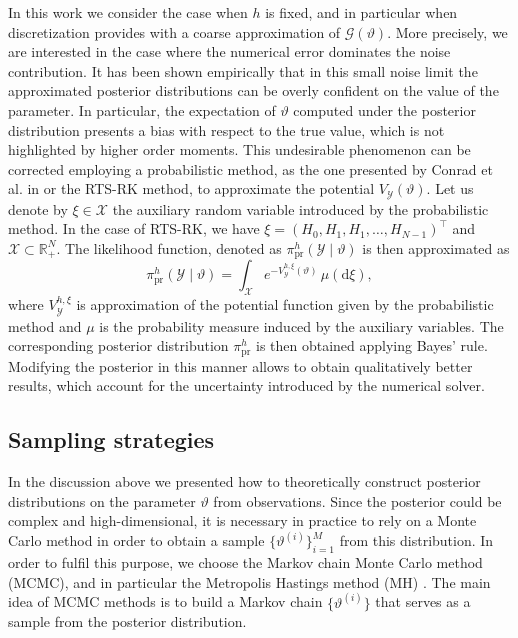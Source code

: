\documentclass{siamart1116}
\numberwithin{theorem}{section}
\renewcommand{\theta}{\vartheta}
\newcommand{\R}{\mathbb{R}}
\newcommand{\dd}{\mathrm{d}}
\begin{document}
In this work we consider the case when $h$ is fixed, and in particular when discretization provides with a coarse approximation of $\mathcal{G}(\theta)$. More precisely, we are interested in the case where the numerical error dominates the noise contribution. It has been shown empirically \cite{CGS16, COS17} that in this small noise limit the approximated posterior distributions can be overly confident on the value of the parameter. In particular, the expectation of $\theta$ computed under the posterior distribution presents a bias with respect to the true value, which is not highlighted by higher order moments. This undesirable phenomenon can be corrected employing a probabilistic method, as the one presented by Conrad et al. in \cite{CGS16} or the RTS-RK method, to approximate the potential $V_\mathcal{Y}(\theta)$. Let us denote by $\xi \in \mathcal{X}$ the auxiliary random variable introduced by the probabilistic method. In the case of RTS-RK, we have $\xi = (H_0, H_1, H_1, \ldots, H_{N-1})^\top$ and $\mathcal{X} \subset \R_+^N$. The likelihood function, denoted as  $\pi^h_{\mathrm{pr}}(\mathcal{Y}\mid\theta)$ is then approximated as 
\begin{equation}\label{eq:LikelihoodProb}
	\pi^h_{\mathrm{pr}}(\mathcal{Y}\mid \theta) = \int_{\mathcal{X}} e^{-V^{h,\xi}_{\mathcal{Y}}(\theta)} \, \mu(\dd \xi),
\end{equation}
where $V^{h, \xi}_{\mathcal{Y}}$ is approximation of the potential function given by the probabilistic method and $\mu$ is the probability measure induced by the auxiliary variables. The corresponding posterior distribution $\pi^h_{\mathrm{pr}}$ is then obtained applying Bayes' rule. Modifying the posterior in this manner allows to obtain qualitatively better results, which account for the uncertainty introduced by the numerical solver.

\subsection{Sampling strategies}\label{sec:Sampling} In the discussion above we presented how to theoretically construct posterior distributions on the parameter $\theta$ from observations. Since the posterior could be complex and high-dimensional, it is  necessary in practice to rely on a Monte Carlo method in order to obtain a sample $\{\theta^{(i)}\}_{i=1}^M$ from this distribution. In order to fulfil this purpose, we choose the Markov chain Monte Carlo method (MCMC), and in particular the Metropolis Hastings method (MH) \cite{KaS05}. The main idea of MCMC methods is to build a Markov chain $\{\theta^{(i)}\}$ that serves as a sample from the posterior distribution.
\end{document}

